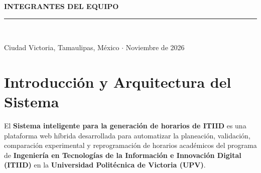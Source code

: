 \documentclass[11pt,letterpaper]{article}
\newcommand{\seccionUPV}[1]{%
    \section{\texorpdfstring{\textcolor{upvmorado}{#1}}{#1}}%
    \vspace{-0.22cm}{\color{upvnaranja}\rule{\textwidth}{1.1pt}}\vspace{0.12cm}%
}
\begin{document}
\begin{titlepage}
    \vspace{0.45cm}
    {\normalsize\bfseries\color{upvmorado} INTEGRANTES DEL EQUIPO\par}
    \vspace{0.18cm}


    \vfill
    {\color{upvmorado}\rule{0.55\textwidth}{0.6pt}}\\[0.15cm]
    {\small\color{gristexto} Ciudad Victoria, Tamaulipas, México $\cdot$ Noviembre de 2026\par}
\end{titlepage}

\tableofcontents
\newpage
{}

\seccionUPV{Introducción y Arquitectura del Sistema}

El \textbf{Sistema inteligente para la generación de horarios de ITIID} es una plataforma web híbrida desarrollada para automatizar la planeación, validación, comparación experimental y reprogramación de horarios académicos del programa de \textbf{Ingeniería en Tecnologías de la Información e Innovación Digital (ITIID)} en la \textbf{Universidad Politécnica de Victoria (UPV)}.
\end{document}
